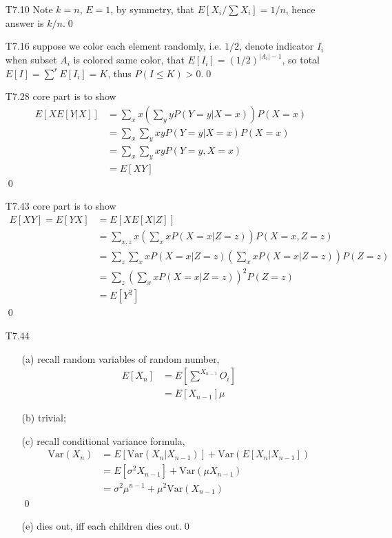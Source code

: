 \documentclass[paper=a4, fontsize=11pt]{scrartcl} %
\numberwithin{equation}{section} %
\numberwithin{figure}{section} %
\numberwithin{table}{section} %
\def \var {\text{Var}}
\begin{document}
\begin{itemize}
\begin{itemize}
\begin{align}
				&> \frac{A+B}{2}
		\end{align}\qed
	\end{itemize}
	\item[T7.10] Note $k=n$, $E=1$, by symmetry, that $E[X_i/\sum X_i] = 1/n$, hence answer is $k/n$.\qed
	\item[T7.16] suppose we color each element randomly, i.e. $1/2$, denote indicator $I_i$ when subset $A_i$ is colored same color, that $E[I_i]= (1/2)^{|A_i|-1}$, so total $E[I]= \sum^r E[I_i]=K$, thus $P(I\leq K)>0$.\qed
	\item[T7.28] core part is to show
	\begin{align}
		E[XE[Y|X]] &= \sum_x x (\sum_y y P(Y=y|X=x)) P(X=x) \\
			&= \sum_x\sum_y xyP(Y=y|X=x)P(X=x) \\
			&= \sum_x\sum_y xyP(Y=y,X=x)\\
			&= E[XY]
	\end{align}\qed
	\item[T7.43] core part is to show
	\begin{align}
		E[XY]=E[YX] &= E[XE[X|Z]] \\
			&= \sum_{x,z} x (\sum_x x P(X=x|Z=z)) P(X=x,Z=z)\\
			&= \sum_z \sum_x x P(X=x|Z=z) (\sum_x x P(X=x|Z=z)) P(Z=z)\\
			&= \sum_z (\sum_x x P(X=x|Z=z))^2 P(Z=z) \\
			&= E[Y^2]
	\end{align}\qed
	\item[T7.44]
	\begin{itemize}
		\item[(a)] recall random variables of random number,
		\begin{align}
			E[X_n] &= E[\sum^{X_{n-1}}O_i] \\
				&= E[X_{n-1}]\mu
		\end{align}
		\item[(b)] trivial;
		\item[(c)] recall conditional variance formula,
		\begin{align}
			\var(X_n)  &= E[\var(X_n|X_{n-1})] + \var(E[X_n|X_{n-1}])\\
				&= E[\sigma^2 X_{n-1}] + \var(\mu X_{n-1})\\
				&= \sigma^2 \mu^{n-1} + \mu^2 \var(X_{n-1})
		\end{align}\qed
		\item[(e)] dies out, iff each children dies out.\qed
	\end{itemize}

\end{itemize}
\end{document}
